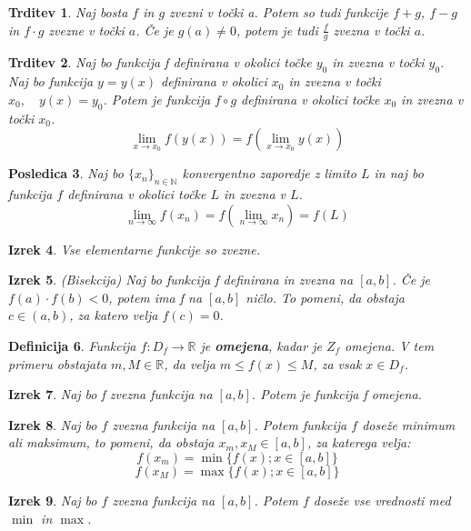 \documentclass[11pt]{article}
\newtheorem{Izrek}{{\sc Izrek}}[section]
\newtheorem{Trditev}[Izrek]{{\sc Trditev}}
\newtheorem{Posledica}[Izrek]{{\sc Posledica}}
\newtheorem{Definicija}[Izrek]{{\sc Definicija}}
\begin{document}
\begin{Trditev}
	Naj bosta $f$ in $g$ zvezni v točki a. Potem so tudi funkcije $f+g$, $f -g$ in $f\cdot g$ zvezne v točki $a$.
	Če je $g(a) \ne 0$, potem je tudi $\frac{f}{g}$ zvezna v točki $a$.
\end{Trditev}
\begin{Trditev}
	Naj bo funkcija f definirana v okolici točke $y_0$ in zvezna v točki $y_0$. Naj bo funkcija $y = y(x)$ definirana v okolici $x_0$ in zvezna v točki $x_0, \quad y(x) = y_0$. Potem je funkcija $f\circ g$ definirana v okolici točke $x_0$ in zvezna v točki $x_0$.
	$$\lim\limits_{x \to x_0}{f(y(x))} = f(\lim\limits_{x \to x_0}{y(x)})$$
\end{Trditev}
\begin{Posledica}
	Naj bo $\{x_n\}_{n\in \mathbb{N}}$ konvergentno zaporedje z limito $L$ in naj bo funkcija $f$ definirana v okolici točke $L$ in zvezna v $L$.
	$$\lim\limits_{n\to \infty}{f(x_n)} = f (\lim\limits_{n\to \infty }{x_n}) = f(L)$$
\end{Posledica}
\begin{Izrek}
	Vse elementarne funkcije so zvezne.
\end{Izrek}
\begin{Izrek}
	(Bisekcija) Naj bo funkcija f definirana in zvezna na $[a,b]$. Če je $f(a) \cdot f(b) < 0$, potem ima f na $[a,b]$ ničlo. To pomeni, da obstaja $c\in (a,b)$, za katero velja $f(c) = 0$.
\end{Izrek}
\begin{Definicija}
	Funkcija $f: D_f \to \mathbb{R}$ je \textbf{omejena}, kadar je $Z_f$ omejena. V tem primeru obstajata $m,M \in \mathbb{R}$, da velja $ m\le f(x)\le M$, za vsak $x\in D_f$.
\end{Definicija}
\begin{Izrek}
	Naj bo f zvezna funkcija na $[a,b]$. Potem je funkcija f omejena.
\end{Izrek}
\begin{Izrek}
	Naj bo $f$ zvezna funkcija na $[a,b]$. Potem funkcija $f$ doseže minimum ali maksimum, to pomeni, da obstaja $x_m, x_M \in [a,b]$, za katerega velja:
	$$f(x_m) = \min\{f(x); x\in [a,b]\}$$
	$$f(x_M) = \max\{f(x); x\in [a,b]\}$$
\end{Izrek}
\begin{Izrek}
	Naj bo $f$ zvezna funkcija na $[a,b]$. Potem $f$ doseže vse vrednosti med $\min$ in $\max$.
\end{Izrek}
\end{document}
